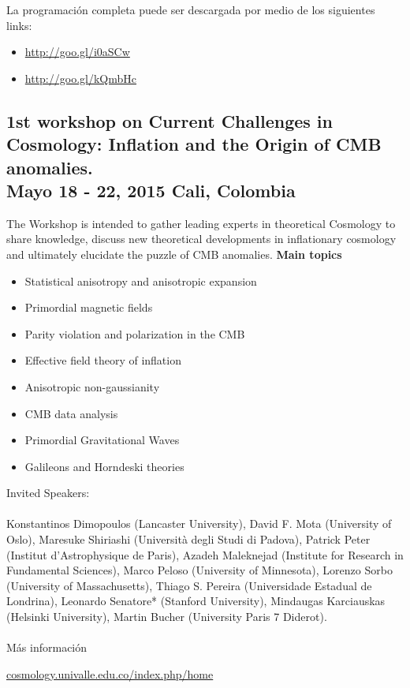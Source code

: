 \documentclass{book}
\begin{document}
\noindent La programación completa puede ser descargada por medio de los siguientes links:

\begin{itemize}
\item \url{http://goo.gl/i0aSCw}
\item \url{http://goo.gl/kQmbHc}
\end{itemize}


\newpage
\subsection{1st workshop on Current Challenges in Cosmology: Inflation and the Origin of CMB anomalies.\\ Mayo 18 - 22, 2015 Cali, Colombia}
The Workshop is intended to gather leading experts in theoretical Cosmology to share knowledge, discuss new theoretical developments in inflationary cosmology and ultimately elucidate the puzzle of CMB anomalies. 
\textbf{Main topics}
\begin{itemize}
\item Statistical anisotropy and anisotropic expansion
\item Primordial magnetic fields
\item Parity violation and polarization in the CMB
\item Effective field theory of inflation
\item Anisotropic non-gaussianity
\item CMB data analysis
\item Primordial Gravitational  Waves
\item Galileons and Horndeski theories
\end{itemize}
\par
\noindent Invited Speakers:\\
\\
Konstantinos Dimopoulos (Lancaster University),	David F. Mota (University of Oslo), Maresuke Shiriashi (Università degli Studi di Padova), Patrick Peter
(Institut d’Astrophysique de Paris), Azadeh Maleknejad (Institute for Research in Fundamental Sciences), Marco Peloso (University of Minnesota), Lorenzo Sorbo (University of Massachusetts), Thiago S. Pereira (Universidade Estadual de Londrina), Leonardo Senatore* (Stanford University), Mindaugas Karciauskas (Helsinki University), Martin Bucher (University Paris 7 Diderot).\\
\\
Más información

\begin{center}
\url{cosmology.univalle.edu.co/index.php/home}
\end{center}
\end{document}
